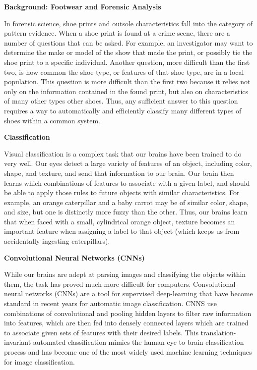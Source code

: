 \documentclass{article}\usepackage[]{graphicx}\usepackage[]{color}
\begin{document}
\textbf{Background: Footwear and Forensic Analysis}

In forensic science, shoe prints and outsole characteristics fall into the category of pattern evidence. When a shoe print is found at a crime scene, there are a number of questions that can be asked. For example, an investigator may want to determine the make or model of the show that made the print, or possibly tie the shoe print to a specific individual. Another question, more difficult than the first two, is how common the shoe type, or features of that shoe type, are in a local population. This question is more difficult than the first two because it relies not only on the information contained in the found print, but also on characteristics of many other types other shoes. Thus, any sufficient answer to this question requires a way to automatically and efficiently classify many different types of shoes within a common system.


\textbf{Classification}

Visual classification is a complex task that our brains have been trained to do very well. Our eyes detect a large variety of features of an object, including color, shape, and texture, and send that information to our brain. Our brain then learns which combinations of features to associate with a given label, and should be able to apply those rules to future objects with similar characteristics. For example, an orange caterpillar and a baby carrot may be of similar color, shape, and size, but one is distinctly more fuzzy than the other. Thus, our brains learn that when faced with a small, cylindrical orange object, texture becomes an important feature when assigning a label to that object (which keeps us from accidentally ingesting caterpillars). 

\textbf{Convolutional Neural Networks (CNNs)}

While our brains are adept at parsing images and classifying the objects within them, the task has proved much more difficult for computers. Convolutional neural networks (CNNs) are a tool for supervised deep-learning that have become standard in recent years for automatic image classification. CNNS use combinations of convolutional and pooling hidden layers to filter raw information into features, which are then fed into densely connected layers which are trained to associate given sets of features with their desired labels. This translation-invariant automated classification mimics the human eye-to-brain classification process and has become one of the most widely used machine learning techniques for image classification.
\end{document}

